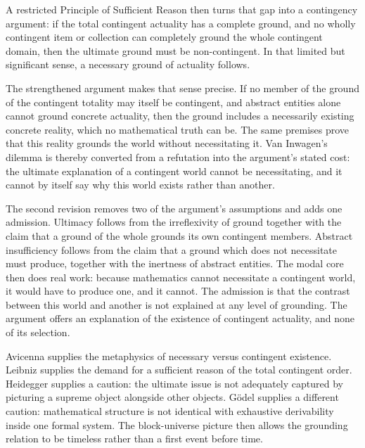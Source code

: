 \documentclass[11pt,letterpaper]{article}
\theoremstyle{plain}
\theoremstyle{definition}
\begin{document}
A restricted Principle of Sufficient Reason then turns that gap into a contingency argument: if the total contingent actuality has a complete ground, and no wholly contingent item or collection can completely ground the whole contingent domain, then the ultimate ground must be non-contingent. In that limited but significant sense, a necessary ground of actuality follows.

The strengthened argument makes that sense precise. If no member of the ground of the contingent totality may itself be contingent, and abstract entities alone cannot ground concrete actuality, then the ground includes a necessarily existing concrete reality, which no mathematical truth can be. The same premises prove that this reality grounds the world without necessitating it. Van Inwagen's dilemma is thereby converted from a refutation into the argument's stated cost: the ultimate explanation of a contingent world cannot be necessitating, and it cannot by itself say why this world exists rather than another.

The second revision removes two of the argument's assumptions and adds one admission. Ultimacy follows from the irreflexivity of ground together with the claim that a ground of the whole grounds its own contingent members. Abstract insufficiency follows from the claim that a ground which does not necessitate must produce, together with the inertness of abstract entities. The modal core then does real work: because mathematics cannot necessitate a contingent world, it would have to produce one, and it cannot. The admission is that the contrast between this world and another is not explained at any level of grounding. The argument offers an explanation of the existence of contingent actuality, and none of its selection.

Avicenna supplies the metaphysics of necessary versus contingent existence. Leibniz supplies the demand for a sufficient reason of the total contingent order. Heidegger supplies a caution: the ultimate issue is not adequately captured by picturing a supreme object alongside other objects. Gödel supplies a different caution: mathematical structure is not identical with exhaustive derivability inside one formal system. The block-universe picture then allows the grounding relation to be timeless rather than a first event before time.
\end{document}
